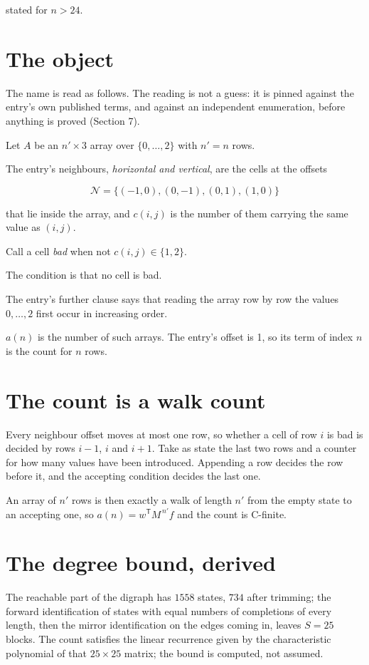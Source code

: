 \documentclass[11pt]{article}
\theoremstyle{definition}
\begin{document}
stated for $n > 24$.

\section{The object}

The name is read as follows. The reading is not a guess: it is pinned against the entry's own published terms, and against an independent enumeration, before anything is proved (Section 7).

Let $A$ be an $n' \times 3$ array over $\{0,\dots,2\}$ with $n' = n$ rows.

The entry's neighbours, {\itshape horizontal and vertical}, are the cells at the offsets

\[\mathcal{N} = \{(-1,0), (0,-1), (0,1), (1,0)\}\]

that lie inside the array, and $c(i,j)$ is the number of them carrying the same value as $(i,j)$.

Call a cell {\itshape bad} when not $c(i,j) \in \{1, 2\}$.

The condition is that no cell is bad.

The entry's further clause says that reading the array row by row the values $0,\dots,2$ first occur in increasing order.

$a(n)$ is the number of such arrays. The entry's offset is 1, so its term of index $n$ is the count for $n$ rows.

\section{The count is a walk count}

Every neighbour offset moves at most one row, so whether a cell of row $i$ is bad is decided by rows $i-1$, $i$ and $i+1$. Take as state the last two rows and a counter for how many values have been introduced. Appending a row decides the row before it, and the accepting condition decides the last one.

An array of $n'$ rows is then exactly a walk of length $n'$ from the empty state to an accepting one, so $a(n) = w^{\mathsf T}M^{\,n'}f$ and the count is C-finite.

\section{The degree bound, derived}

The reachable part of the digraph has $1558$ states, $734$ after trimming; the forward identification of states with equal numbers of completions of every length, then the mirror identification on the edges coming in, leaves $S = 25$ blocks. The count satisfies the linear recurrence given by the characteristic polynomial of that $25\times25$ matrix; the bound is computed, not assumed.
\end{document}
